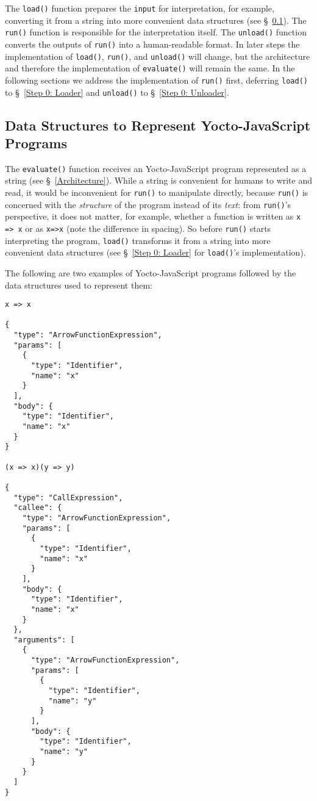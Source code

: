 \documentclass[12pt, oneside]{book}
\begin{document}
The \texttt{load()} function prepares the \texttt{input} for interpretation, for example, converting it from a string into more convenient data structures (see §~\ref{Data Structures to Represent Yocto-JavaScript Programs}). The \texttt{run()} function is responsible for the interpretation itself. The \texttt{unload()} function converts the outputs of \texttt{run()} into a human-readable format. In later steps the implementation of \texttt{load()}, \texttt{run()}, and \texttt{unload()} will change, but the architecture and therefore the implementation of \texttt{evaluate()} will remain the same. In the following sections we address the implementation of \texttt{run()} first, deferring \texttt{load()} to §~\ref{Step 0: Loader} and \texttt{unload()} to §~\ref{Step 0: Unloader}.

\subsection{Data Structures to Represent Yocto-JavaScript Programs}
\label{Data Structures to Represent Yocto-JavaScript Programs}

The \texttt{evaluate()} function receives an Yocto-JavaScript program represented as a string (see §~\ref{Architecture}). While a string is convenient for humans to write and read, it would be inconvenient for \texttt{run()} to manipulate directly, because \texttt{run()} is concerned with the \emph{structure} of the program instead of its \emph{text}: from \texttt{run()}’s perspective, it does not matter, for example, whether a function is written as \texttt{x => x} or as \texttt{x=>x} (note the difference in spacing). So before \texttt{run()} starts interpreting the program, \texttt{load()} transforms it from a string into more convenient data structures (see §~\ref{Step 0: Loader} for \texttt{load()}’s implementation).

The following are two examples of Yocto-JavaScript programs followed by the data structures used to represent them:

\begin{verbatim}
x => x

{
  "type": "ArrowFunctionExpression",
  "params": [
    {
      "type": "Identifier",
      "name": "x"
    }
  ],
  "body": {
    "type": "Identifier",
    "name": "x"
  }
}

(x => x)(y => y)

{
  "type": "CallExpression",
  "callee": {
    "type": "ArrowFunctionExpression",
    "params": [
      {
        "type": "Identifier",
        "name": "x"
      }
    ],
    "body": {
      "type": "Identifier",
      "name": "x"
    }
  },
  "arguments": [
    {
      "type": "ArrowFunctionExpression",
      "params": [
        {
          "type": "Identifier",
          "name": "y"
        }
      ],
      "body": {
        "type": "Identifier",
        "name": "y"
      }
    }
  ]
}
\end{verbatim}
\end{document}
